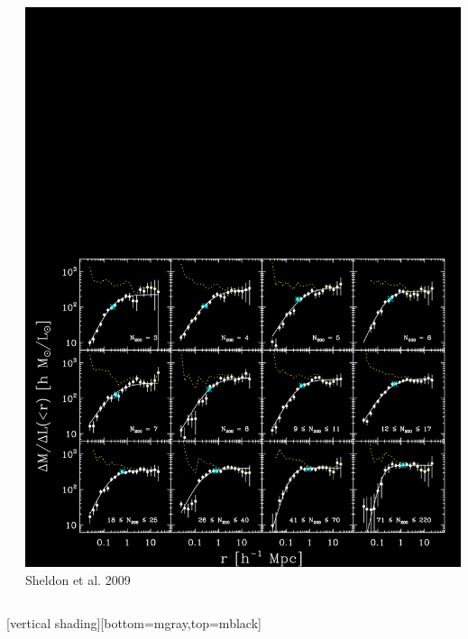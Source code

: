 \documentclass{beamer}
\begin{document}
{{\begin{columns}
\begin{column}{0.5\textwidth}
\begin{itemize}
                \end{itemize}
            \end{column}
            \begin{column}{0.5\textwidth}
                \centering
                \includegraphics[trim=0 0 0 800,clip,width=\textwidth]{m2l-ngals200_12-m21-22-l4-m2lfits-color.png}
                \newline
                {\color{gold}Sheldon et al. 2009}
            \end{column}
        \end{columns}
    }


    [vertical shading][bottom=mgray,top=mblack]
}
\end{document}
